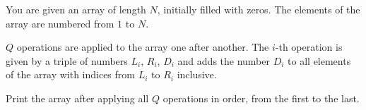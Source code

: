 You are given an array of length $N$, initially filled with zeros. The elements of the array are numbered from $1$ to $N$.

$Q$ operations are applied to the array one after another. The $i$-th operation is given by a triple of numbers $L_i$, $R_i$, $D_i$ and adds the number $D_i$ to all elements of the array with indices from $L_i$ to $R_i$ inclusive.

Print the array after applying all $Q$ operations in order, from the first to the last.
